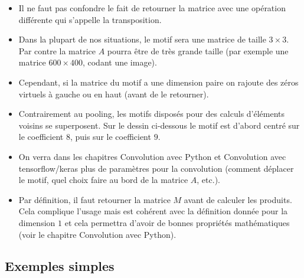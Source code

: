 \documentclass[11pt,class=report,crop=false]{standalone}
\begin{document}
  
\begin{remarque*}
\sauteligne
\begin{itemize}

  \item Il ne faut pas confondre le fait de retourner la matrice avec une opération différente qui s'appelle la transposition.
  
  \item Dans la plupart de nos situations, le motif sera une matrice de taille $3 \times 3$. Par contre la matrice $A$ pourra être de très grande taille (par exemple une matrice $600 \times 400$, codant une image).
  
  \item Cependant, si la matrice du motif a une dimension paire on rajoute des zéros virtuels à gauche ou en haut (avant de le retourner).

   
\item Contrairement au pooling, les motifs disposés pour des calculs d'éléments voisins se superposent.
  Sur le dessin ci-dessous le motif est d'abord centré sur le coefficient $8$, puis sur le coefficient $9$.
  
  
  \item On verra dans les chapitres \og{}Convolution avec Python\fg{} et \og{}Convolution avec tensorflow/keras\fg{}
  plus de paramètres pour la convolution (comment déplacer le motif, quel choix faire au bord de la matrice $A$, etc.).
  
  \item Par définition, il faut retourner la matrice $M$ avant de calculer les produits. Cela complique l'usage mais est cohérent avec la définition donnée pour la dimension $1$ et cela permettra d'avoir de bonnes propriétés mathématiques (voir le chapitre \og{}Convolution avec Python\fg{}).
\end{itemize}
\end{remarque*} 

\subsection{Exemples simples}
\end{document}
